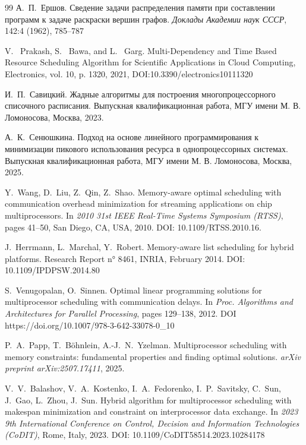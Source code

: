 {\small
\begin{thebibliography}{99}
	А.~П.~Ершов.
	\newblock Сведение задачи распределения памяти при составлении программ к задаче раскраски вершин графов.
	\newblock \emph{Доклады Академии наук СССР}, 142:4 (1962), 785–787
	
	V. ~Prakash, S. ~Bawa, and L. ~Garg.
	\newblock Multi-Dependency and Time Based Resource Scheduling Algorithm for Scientific Applications in Cloud Computing, Electronics, vol. 10, p. 1320, 2021, DOI:10.3390/electronics10111320
	
	И.~П.~Савицкий.
	\newblock Жадные алгоритмы для построения многопроцессорного списочного расписания.
	\newblock Выпускная квалификационная работа, МГУ имени М. В. Ломоносова, Москва, 2023.
	
	А.~К.~Сенюшкина.
	\newblock Подход на основе линейного программирования к минимизации пикового использования ресурса в однопроцессорных системах.
	\newblock Выпускная квалификационная работа, МГУ имени М. В. Ломоносова, Москва, 2025.
	
	Y.~Wang, D.~Liu, Z.~Qin, Z.~Shao.
	\newblock Memory-aware optimal scheduling with communication overhead minimization for streaming applications on chip multiprocessors.
	\newblock In \emph{2010 31st IEEE Real-Time Systems Symposium (RTSS)}, pages 41–50, San Diego, CA, USA, 2010.
	\newblock DOI: 10.1109/RTSS.2010.16.
	
	J.~Herrmann, L.~Marchal, Y.~Robert.
	\newblock Memory-aware list scheduling for hybrid platforms.
	\newblock Research Report n° 8461, INRIA, February 2014. DOI: 
	10.1109/IPDPSW.2014.80 
	
	S.~Venugopalan, O.~Sinnen.
	\newblock Optimal linear programming solutions for multiprocessor scheduling with communication delays.
	\newblock In \emph{Proc. Algorithms and Architectures for Parallel Processing}, pages 129–138, 2012. DOI
	https://doi.org/10.1007/978-3-642-33078-0\_10
	
	P.~A.~Papp, T.~Böhnlein, A.-J.~N.~Yzelman.
	\newblock Multiprocessor scheduling with memory constraints: fundamental properties and finding optimal solutions.
	\newblock \emph{arXiv preprint arXiv:2507.17411}, 2025.
	
	V.~V.~Balashov, V.~A.~Kostenko, I.~A.~Fedorenko, I.~P.~Savitsky, C.~Sun, J.~Gao, L.~Zhou, J.~Sun.
	\newblock Hybrid algorithm for multiprocessor scheduling with makespan minimization and constraint on interprocessor data exchange.
	\newblock In \emph{2023 9th International Conference on Control, Decision and Information Technologies (CoDIT)}, Rome, Italy, 2023. DOI: 10.1109/CoDIT58514.2023.10284178
	

\end{thebibliography}}
